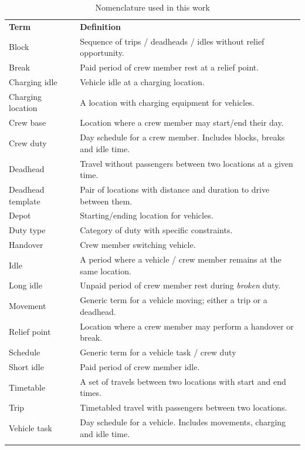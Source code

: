 \documentclass[]{article}
\begin{document}
\begin{table}[h]
  \centering
  \begin{tabular}{ll}
    \toprule
    \multicolumn{1}{l}{\textbf{Term}} & \multicolumn{1}{l}{\textbf{Definition}} \\
    \cmidrule(lr){1-1} \cmidrule(lr){2-2}
    Block & Sequence of trips / deadheads / idles without relief opportunity. \\
    Break & Paid period of crew member rest at a relief point. \\ 
    Charging idle & Vehicle idle at a charging location. \\
    Charging location & A location with charging equipment for vehicles. \\
    Crew base & Location where a crew member may start/end their day. \\  
    Crew duty & Day schedule for a crew member. Includes blocks, breaks and idle time. \\
    Deadhead & Travel without passengers between two locations at a given time. \\
    Deadhead template & Pair of locations with distance and duration to drive between them. \\
    Depot & Starting/ending location for vehicles. \\
    Duty type & Category of duty with specific constraints. \\
    Handover & Crew member switching vehicle. \\ 
    Idle & A period where a vehicle / crew member remains at the same location. \\
    Long idle & Unpaid period of crew member rest during \textit{broken} duty. \\
    Movement & Generic term for a vehicle moving; either a trip or a deadhead. \\
    Relief point & Location where a crew member may perform a handover or break. \\
    Schedule & Generic term for a vehicle task / crew duty \\ 
    Short idle & Paid period of crew member idle. \\ 
    Timetable & A set of travels between two locations with start and end times. \\  
    Trip & Timetabled travel with passengers between two locations. \\
    Vehicle task & Day schedule for a vehicle. Includes movements, charging and idle time. \\
    \addlinespace[0.2em]
    \bottomrule
  \end{tabular}
  \caption{Nomenclature used in this work}
  \label{tab:nomenclature}
\end{table}
\end{document}
